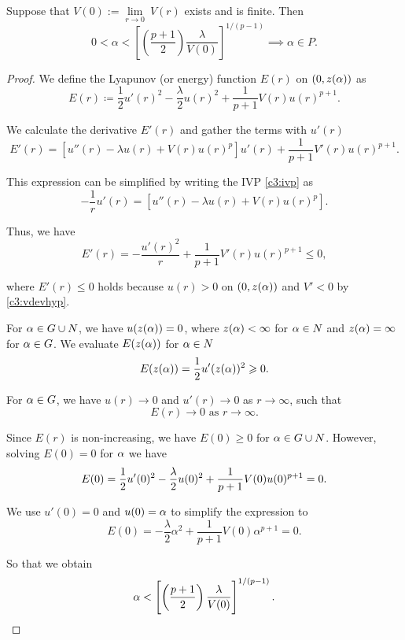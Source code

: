 \begin{lemma}\label{genlem1}%
Suppose that $V(0):=\underset{r\to0}{\lim}~V(r)$ exists and is finite. Then
\[ 0<\alpha<\left[\left(\frac{p+1}{2}\right)\frac{\lambda}{V(0)}
\right]^{1/(p-1)}\implies \alpha\in P. \]
\end{lemma}
\begin{proof}
We define the Lyapunov (or energy) function $E(r)$ on $(0,z(\alpha))$ as
\[ E(r) \coloneqq \frac{1}{2}u'(r)^2
-\frac{\lambda}{2} u(r)^2 + \frac{1}{p+1} V(r) u(r)^{p+1}. \]

We calculate the derivative $E'(r)$ and gather the terms with $u'(r)$
\[ E'(r) = \left[u''(r)-\lambda u(r)+V(r)u(r)^p\right]u'(r)
+ \frac{1}{p+1} V'(r)u(r)^{p+1}. \]

This expression can be simplified by writing the IVP \eqref{c3:ivp} as
\[ -\frac{1}{r}u'(r)=\left[u''(r)-\lambda u(r)+V(r)u(r)^p\right]. \]

Thus, we have
\[ E'(r) = -\frac{u'(r)^2}{r}
+ \frac{1}{p+1} V'(r)u(r)^{p+1} \leq 0, \]

where $E'(r)\leq 0$ holds because $u(r)>0$ on $(0,z(\alpha))$ and $V'<0$ by
\eqref{c3:vdevhyp}. 

For $\alpha\in G\cup N$, we have $u(z(\alpha))=0$, where $z(\alpha)<\infty$ for $\alpha\in N$ and
$z(\alpha)=\infty$ for $\alpha\in G$. We evaluate $E(z(\alpha))$ for $\alpha\in N$
\[ E(z(\alpha)) = \frac{1}{2} u'(z(\alpha))^2 \geqslant 0. \]

For $\alpha\in G$, we have $u(r)\to 0$ and $u'(r)\to 0$ as $r\to\infty$, such that
\[ E(r)\to 0\text{ as }r\to\infty. \]

Since $E(r)$ is non-increasing, we have $E(0)\geq 0$ for $\alpha\in G\cup N$.
However, solving $E(0)=0$ for $\alpha$ we have
\[ E(0) = \frac{1}{2} u'(0)^2 - \frac{\lambda}{2} u(0)^2
 + \frac{1}{p+1} V(0)u(0)^{p+1} = 0. \]

We use $u'(0)=0$ and $u(0)=\alpha$ to simplify the expression to
\[ E(0) = -\frac{\lambda}{2}\alpha^2 + 
\frac{1}{p+1} V(0)\alpha^{p+1} = 0. \]

So that we obtain 
\[
\alpha < \left[\left( \frac{p+1}{2}\right) \frac{\lambda}{V(0)} \right]^{1/(p-1)}.
\]


\end{proof}

